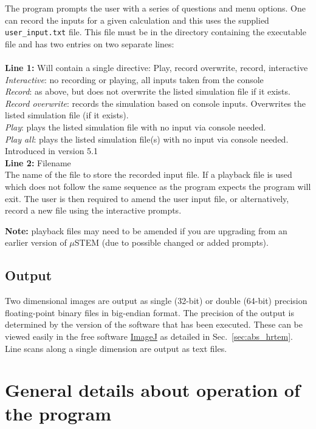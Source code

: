 \documentclass[12pt,a4paper]{article}
\begin{document}
The program prompts the user with a series of questions and menu options.
One can record the inputs for a given calculation and this uses the supplied \verb|user_input.txt| file.
This file must be in the directory containing the executable file and has two entries on two separate lines: \\ \\
{\bf Line 1:} Will contain a single directive: Play, record overwrite, record, interactive \\
\emph {Interactive}: no recording or playing, all inputs taken from the console \\
\emph {Record}: as above, but does not overwrite the listed simulation file if it exists. \\
\emph {Record overwrite}: records the simulation based on console inputs. Overwrites the listed simulation file (if it exists). \\
\emph {Play}: plays the listed simulation file with no input via console needed. \\
\emph {Play all}: plays the listed simulation file(s) with no input via console needed. Introduced in version 5.1\\
{\bf Line 2:} Filename \\
The name of the file to store the recorded input file.
If a playback file is used which does not  follow the same sequence as the program expects the program will exit. 
The user is then required to amend the user input file, or alternatively, record a new file using the interactive prompts.

{\bf Note:} playback files may need to be amended if you are upgrading from an earlier version of $\mu$STEM (due to possible changed or added prompts).
%
\subsection{Output}\label{output}
Two dimensional images are output as single (32-bit) or double (64-bit) precision floating-point binary files in big-endian format.
The precision of the output is determined by the version of the software that has been executed. These can be viewed easily in the free software \href{http://imagej.nih.gov/ij/}{ImageJ} as detailed in Sec.~\ref{sec:abs_hrtem}.
Line scans along a single dimension are output as text files.




\section{General details about operation of the program}
\end{document}
